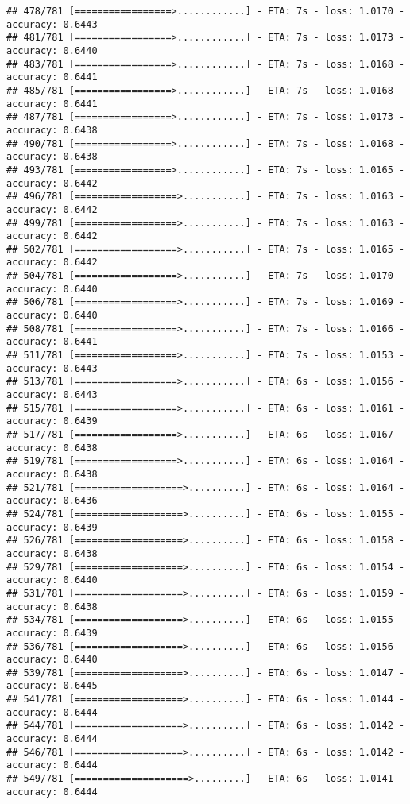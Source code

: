 \documentclass[
]{article}
\begin{document}
\begin{verbatim}
## 478/781 [=================>............] - ETA: 7s - loss: 1.0170 - accuracy: 0.6443
## 481/781 [=================>............] - ETA: 7s - loss: 1.0173 - accuracy: 0.6440
## 483/781 [=================>............] - ETA: 7s - loss: 1.0168 - accuracy: 0.6441
## 485/781 [=================>............] - ETA: 7s - loss: 1.0168 - accuracy: 0.6441
## 487/781 [=================>............] - ETA: 7s - loss: 1.0173 - accuracy: 0.6438
## 490/781 [=================>............] - ETA: 7s - loss: 1.0168 - accuracy: 0.6438
## 493/781 [=================>............] - ETA: 7s - loss: 1.0165 - accuracy: 0.6442
## 496/781 [==================>...........] - ETA: 7s - loss: 1.0163 - accuracy: 0.6442
## 499/781 [==================>...........] - ETA: 7s - loss: 1.0163 - accuracy: 0.6442
## 502/781 [==================>...........] - ETA: 7s - loss: 1.0165 - accuracy: 0.6442
## 504/781 [==================>...........] - ETA: 7s - loss: 1.0170 - accuracy: 0.6440
## 506/781 [==================>...........] - ETA: 7s - loss: 1.0169 - accuracy: 0.6440
## 508/781 [==================>...........] - ETA: 7s - loss: 1.0166 - accuracy: 0.6441
## 511/781 [==================>...........] - ETA: 7s - loss: 1.0153 - accuracy: 0.6443
## 513/781 [==================>...........] - ETA: 6s - loss: 1.0156 - accuracy: 0.6443
## 515/781 [==================>...........] - ETA: 6s - loss: 1.0161 - accuracy: 0.6439
## 517/781 [==================>...........] - ETA: 6s - loss: 1.0167 - accuracy: 0.6438
## 519/781 [==================>...........] - ETA: 6s - loss: 1.0164 - accuracy: 0.6438
## 521/781 [===================>..........] - ETA: 6s - loss: 1.0164 - accuracy: 0.6436
## 524/781 [===================>..........] - ETA: 6s - loss: 1.0155 - accuracy: 0.6439
## 526/781 [===================>..........] - ETA: 6s - loss: 1.0158 - accuracy: 0.6438
## 529/781 [===================>..........] - ETA: 6s - loss: 1.0154 - accuracy: 0.6440
## 531/781 [===================>..........] - ETA: 6s - loss: 1.0159 - accuracy: 0.6438
## 534/781 [===================>..........] - ETA: 6s - loss: 1.0155 - accuracy: 0.6439
## 536/781 [===================>..........] - ETA: 6s - loss: 1.0156 - accuracy: 0.6440
## 539/781 [===================>..........] - ETA: 6s - loss: 1.0147 - accuracy: 0.6445
## 541/781 [===================>..........] - ETA: 6s - loss: 1.0144 - accuracy: 0.6444
## 544/781 [===================>..........] - ETA: 6s - loss: 1.0142 - accuracy: 0.6444
## 546/781 [===================>..........] - ETA: 6s - loss: 1.0142 - accuracy: 0.6444
## 549/781 [====================>.........] - ETA: 6s - loss: 1.0141 - accuracy: 0.6444

\end{verbatim}
\end{document}
